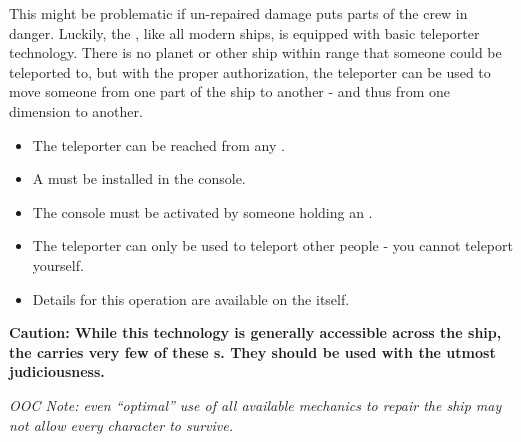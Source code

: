 \documentclass[green]{TMFHope}
\begin{document}
This might be problematic if un-repaired damage puts parts of the crew in danger. Luckily, the \pNew{}, like all modern ships, is equipped with basic teleporter technology. There is no planet or other ship within range that someone could be teleported to, but with the proper authorization, the teleporter can be used to move someone from one part of the ship to another - and thus from one dimension to another.
\begin{itemize}
  \item The teleporter can be reached from any \sConsole{}.
  \item A \iCrystal{} must be installed in the console.
	\item The console must be activated by someone holding an \iKey{}.
	\item The teleporter can only be used to teleport other people - you cannot teleport yourself.
	\item Details for this operation are available on the \sConsole{} itself.
\end{itemize}
\bf{Caution:} While this technology is generally accessible across the ship, the \pNew{} carries \bf{very few} of these \iCrystal{}s. They should be used with the utmost judiciousness. 

\emph{OOC Note: even ``optimal'' use of all available mechanics to repair the ship may not allow every character to survive.}
\end{document}
